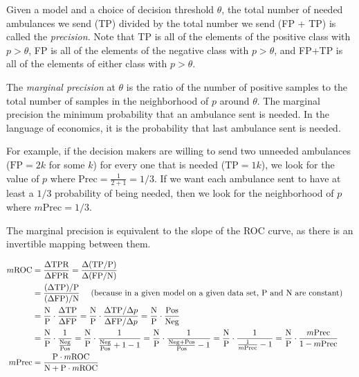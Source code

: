 Given a model and a choice of decision threshold $\theta$, the total number of needed ambulances we send (TP) divided by the total number we send (FP + TP) is called the {\it precision}.  Note that TP is all of the elements of the positive class with $p> \theta$, FP is all of the elements of the negative class with $p > \theta$, and FP+TP is all of the elements of either class with $p > \theta$.  

The {\it marginal precision} at $\theta$ is the ratio of the number of positive samples to the total number of samples in the neighborhood of $p$ around $\theta$.  The marginal precision the minimum probability that an ambulance sent is needed.  In the language of economics, it is the probability that last ambulance sent is needed.

For example, if the decision makers are willing to send two unneeded ambulances ($\text{FP} = 2k$ for some $k$) for every one that is needed ($\text{TP} = 1k$), we look for the value of $p$ where $\text{Prec} = \frac{1}{2+1} = 1/3$.  If we want each ambulance sent to have at least a $1/3$ probability of being needed, then we look for the neighborhood of $p$ where $m\text{Prec} = 1/3$.  

The marginal precision is equivalent to the slope of the ROC curve, as there is an invertible mapping between them.  

\begin{align*}
	m\text{ROC} 
	&= \frac{\Delta \text{TPR}}{\Delta \text{FPR}}
	= \frac{ \Delta (\text{TP}/\text{P})}{\Delta (\text{FP}/\text{N})} 
	\cr &
	= \frac{ (\Delta \text{TP})/\text{P}}{(\Delta \text{FP})/\text{N}} \quad  \text{ (because in a given model on a given data set, P and N are constant) }
	\cr &
	= \frac{\text{N}}{\text{P}} \cdot \frac{\Delta \text{TP}}{\Delta \text{FP}}
	= \frac{\text{N}}{\text{P}} \cdot \frac{\Delta \text{TP}/\Delta p}{\Delta \text{FP}/\Delta p}
	= \frac{\text{N}}{\text{P}}  \cdot\frac{\text{Pos}}{\text{Neg}} 
	\cr &
	= \frac{\text{N}}{\text{P}} \cdot \frac{1}{ \frac{\text{Neg}}{\text{Pos}} }
	= \frac{\text{N}}{\text{P}} \cdot \frac{1}{ \frac{\text{Neg}}{\text{Pos}} + 1 - 1 }
	= \frac{\text{N}}{\text{P}} \cdot \frac{1}{ \frac{\text{Neg} + \text{Pos}}{\text{Pos}} - 1 }
	= \frac{\text{N}}{\text{P}} \cdot \frac{1}{ \frac{1}{m\text{Prec}} - 1 }
	= \frac{\text{N}}{\text{P}} \cdot \frac{m\text{Prec}}{1 - m\text{Prec}}
	\cr	
	m\text{Prec} &= \frac{ \text{P} \cdot m\text{ROC}}{\text{N} + \text{P} \cdot m\text{ROC}} \cr 
\end{align*}
 

